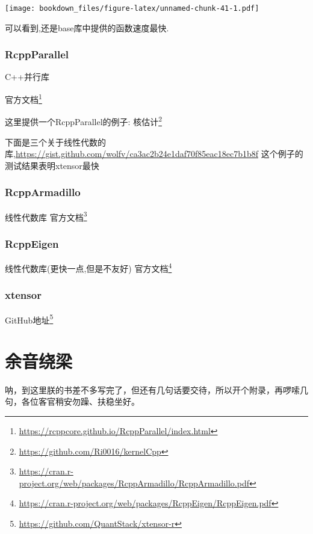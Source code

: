\documentclass[]{ctexbook}
\renewcommand{\href}[2]{#2\footnote{\url{#1}}}
\begin{document}
\texttt{[image: bookdown\_files/figure-latex/unnamed-chunk-41-1.pdf]}

可以看到,还是base库中提供的函数速度最快.

\hypertarget{rcppparallel}{%
\subsection{RcppParallel}\label{rcppparallel}}

C++并行库

\href{https://rcppcore.github.io/RcppParallel/index.html}{官方文档}

这里提供一个RcppParallel的例子:
\href{https://github.com/Ri0016/kernelCpp}{核估计}

下面是三个关于线性代数的库,\url{https://gist.github.com/wolfv/ca3ac2b24e1daf70f85eac18ec7b1b8f}
这个例子的测试结果表明xtensor最快

\hypertarget{rcpparmadillo}{%
\subsection{RcppArmadillo}\label{rcpparmadillo}}

线性代数库
\href{https://cran.r-project.org/web/packages/RcppArmadillo/RcppArmadillo.pdf}{官方文档}

\hypertarget{rcppeigen}{%
\subsection{RcppEigen}\label{rcppeigen}}

线性代数库(更快一点,但是不友好)
\href{https://cran.r-project.org/web/packages/RcppEigen/RcppEigen.pdf}{官方文档}

\hypertarget{xtensor}{%
\subsection{xtensor}\label{xtensor}}

\href{https://github.com/QuantStack/xtensor-r}{GitHub地址}

\cleardoublepage

\hypertarget{appendix-}{%
\appendix {}}


\hypertarget{sound}{%
\chapter{余音绕梁}\label{sound}}

呐，到这里朕的书差不多写完了，但还有几句话要交待，所以开个附录，再啰嗦几句，各位客官稍安勿躁、扶稳坐好。



\backmatter
\printindex
\end{document}
